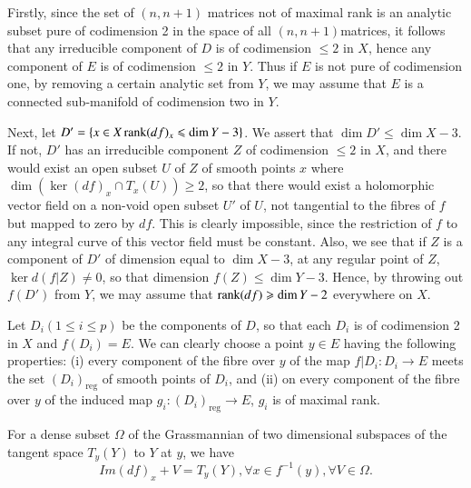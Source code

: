 Firstly, since the set of $(n, n +1)$ matrices not of maximal rank is an analytic subset pure of codimension 2 in the space of all $(n, n+1)$\pageoriginale matrices,  it follows that any irreducible component of $D$ is of codimension $\leqslant 2$ in $X$, hence any component of $E$ is of codimension $\leqslant 2$ in $Y$. Thus if $E$ is not pure of codimension  one, by removing a certain analytic set from $Y$, we may assume that $E$ is a connected sub-manifold of codimension two in $Y$.

Next, let $D' = \{x \in X \operatorname{rank} (df)_x \leqslant \dim Y -3  \}$. We assert that $\dim D' \leqslant \dim X -3$. If not, $D'$ has an irreducible component $Z$ of codimension $\leqslant 2$ in $X$,  and there would exist an open subset $U$ of $Z$ of smooth points $x$ where $\dim (\ker (df)_{x} \cap T_x (U)) \geqslant 2$, so that there would  exist a holomorphic vector field on a non-void open subset $U'$ of $U$, not tangential to the fibres of $f$ but mapped to zero by $df$. This is clearly impossible, since the restriction of $f$ to any integral curve of this vector field must be constant. Also, we see that if $Z$ is a component of $D'$ of dimension equal to $\dim X -3$, at any regular point of $Z$, $\ker d (f |Z) \neq 0$, so that dimension $f(Z)\leqslant \dim Y - 3$. Hence, by throwing out $f(D')$ from $Y$, we may assume that $\operatorname{rank} (df) \geqslant \dim Y - 2$ everywhere on $X$.

Let $D_i (1 \leqslant i \leqslant p)$ be the components of $D$, so that each $D_i$ is of codimension 2 in $X$ and $f(D_i) = E$. We can clearly choose a point $y \in E$ having the following properties: (i) every component of the fibre over $y$ of the map $f|D_i: D_i \to E$ meets the set $(D_i)_{\text{reg}}$ of smooth points of $D_i$, and (ii) on every component of the fibre over $y$ of the induced map $g_i:(D_i)_{\text{reg}} \to E$, $g_i$ is of maximal rank.

\begin{lemma*}
For a dense subset $\Omega$ of the Grassmannian of two dimensional subspaces of the tangent space $T_y (Y)$ to $Y$ at $y$, we have 
$$
Im (df)_x + V = T_y (Y), \forall x \in f^{-1} (y), \forall V \in \Omega.
$$
\end{lemma*}

